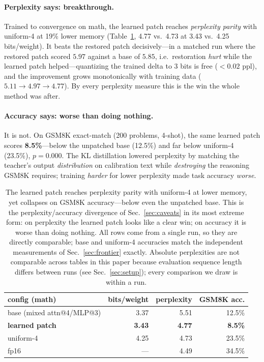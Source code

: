 \documentclass[11pt]{article}
\newcommand{\bpw}{bits/weight}
\begin{document}
\paragraph{Perplexity says: breakthrough.} Trained to convergence on math, the
learned patch reaches \emph{perplexity parity} with uniform-4 at 19\% lower
memory (Table~\ref{tab:learned}, 4.77 vs.\ 4.73 at 3.43 vs.\ 4.25 \bpw{}). It
beats the restored patch decisively---in a matched run where the restored patch
scored $5.97$ against a base of $5.85$, i.e.\ restoration \emph{hurt} while the
learned patch helped---quantizing the trained delta to 3 bits is free
($<0.02$ ppl), and the improvement grows monotonically with training data
($5.11 \to 4.97 \to 4.77$). By every perplexity measure this is the win the
whole method was after.

\paragraph{Accuracy says: worse than doing nothing.} It is not. On GSM8K
exact-match (200 problems, 4-shot), the same learned patch scores
\textbf{8.5\%}---below the unpatched base (12.5\%) and far below uniform-4
(23.5\%), $p{=}0.000$. The KL distillation lowered perplexity by matching the
teacher's output \emph{distribution} on calibration text while \emph{destroying}
the reasoning GSM8K requires; training \emph{harder} for lower perplexity made
task accuracy \emph{worse}.

\begin{table}[t]
\centering
\caption{The learned patch reaches perplexity parity with uniform-4 at lower
memory, yet collapses on GSM8K accuracy---below even the unpatched base. This
is the perplexity/accuracy divergence of Sec.~\ref{sec:caveats} in its most
extreme form: on perplexity the learned patch looks like a clear win; on
accuracy it is worse than doing nothing. All rows come from a single run, so
they are directly comparable; base and uniform-4 accuracies match the
independent measurements of Sec.~\ref{sec:frontier} exactly. Absolute
perplexities are not comparable across tables in this paper because evaluation
sequence length differs between runs (see Sec.~\ref{sec:setup}); every
comparison we draw is within a run.}
\label{tab:learned}
\begin{tabular}{lrrr}
\toprule
config (math) & \bpw{} & perplexity & GSM8K acc. \\
\midrule
base (mixed attn@4/MLP@3) & 3.37 & 5.51 & 12.5\% \\
\textbf{learned patch} & \textbf{3.43} & \textbf{4.77} & \textbf{8.5\%} \\
uniform-4 & 4.25 & 4.73 & 23.5\% \\
fp16 & --- & 4.49 & 34.5\% \\
\bottomrule
\end{tabular}
\end{table}
\end{document}
